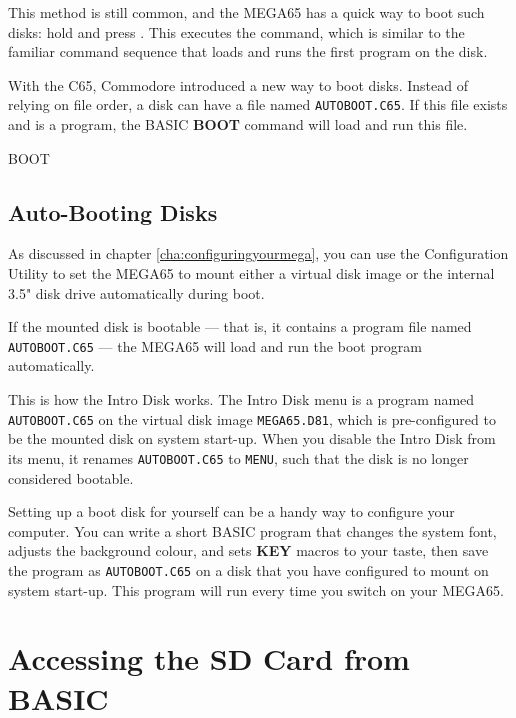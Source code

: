 This method is still common, and the MEGA65 has a quick way to boot such disks: hold  and press . This executes the  command, which is similar to the familiar command sequence that loads and runs the first program on the disk.

With the C65, Commodore introduced a new way to boot disks. Instead of relying on file order, a disk can have a file named {\tt AUTOBOOT.C65}. If this file exists and is a program, the BASIC {\bf BOOT} command will load and run this file.

\begin{screencode}
BOOT
\end{screencode}

\subsection{Auto-Booting Disks}

As discussed in chapter \vref{cha:configuringyourmega}, you can use the Configuration Utility to set the MEGA65 to mount either a virtual disk image or the internal 3.5" disk drive automatically during boot.

If the mounted disk is bootable --- that is, it contains a program file named {\tt AUTOBOOT.C65} --- the MEGA65 will load and run the boot program automatically.

This is how the Intro Disk works. The Intro Disk menu is a program named {\tt AUTOBOOT.C65} on the virtual disk image {\tt MEGA65.D81}, which is pre-configured to be the mounted disk on system start-up. When you disable the Intro Disk from its menu, it renames {\tt AUTOBOOT.C65} to {\tt MENU}, such that the disk is no longer considered bootable.

Setting up a boot disk for yourself can be a handy way to configure your computer. You can write a short BASIC program that changes the system font, adjusts the background colour, and sets {\bf KEY} macros to your taste, then save the program as {\tt AUTOBOOT.C65} on a disk that you have configured to mount on system start-up. This program will run every time you switch on your MEGA65.


\section{Accessing the SD Card from BASIC}

